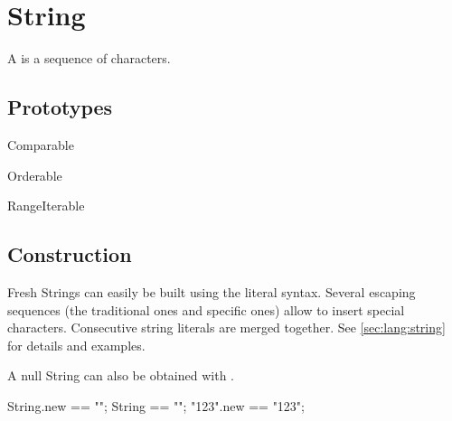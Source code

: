 
\section{String}

A  is a sequence of characters.

\subsection{Prototypes}
\begin{refObjects}
\item[Comparable]
\item[Orderable]
\item[RangeIterable]
\end{refObjects}

\subsection{Construction}
Fresh Strings can easily be built using the literal syntax.  Several
escaping sequences (the traditional ones and \us specific ones) allow to
insert special characters.  Consecutive string literals are merged together.
See \autoref{sec:lang:string} for details and examples.

A null String can also be obtained with .

\begin{urbiassert}
String.new == "";
String == "";
"123".new == "123";
\end{urbiassert}

